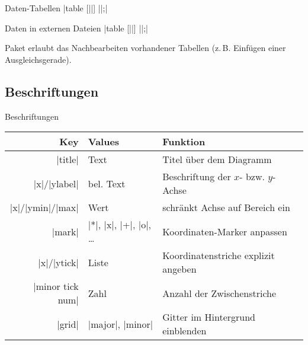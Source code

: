 \documentclass[
	vorläufig=false,
	datum=2017-12-01,
	titel={Diagramme},
	web=false,
	mo,
	aspectratio=1610,
]{../tex/latexkurs-slides}
\begin{document}
\begin{frame}[fragile,t]{Daten-Tabellen}
| table [||] {||};|
\vfill
\begin{LTXexample}[pos=r, explpreset={}, preset=\small, rframe={}]
\end{LTXexample}
\end{frame}


\begin{frame}[fragile,t]{Daten in externen Dateien}
| table [||] {||};|\vfill
\begin{LTXexample}[pos=r, explpreset={}, preset=\small, rframe={}]
\end{LTXexample}
\pause
Paket  erlaubt das Nachbearbeiten vorhandener Tabellen (z.\,B. Einfügen einer Ausgleichsgerade).
\end{frame}

\subsection{Beschriftungen}
\begin{frame}[fragile]{Beschriftungen}
\begin{tabular}{rll}
Key & Values & Funktion\\\midrule
|title| & Text & Titel über dem Diagramm\\
|x|/|ylabel| & bel. Text & Beschriftung der $x$- bzw. $y$-Achse  \\
|x|/|ymin|/|max| & Wert & schränkt Achse auf Bereich ein\\
|mark| & |*|, |x|, |+|, |o|, … & Koordinaten-Marker anpassen\\
|x|/|ytick| & Liste & Koordinatenstriche explizit angeben\\
|minor tick num| & Zahl & Anzahl der Zwischenstriche\\
|grid| & |major|, |minor| & Gitter im Hintergrund einblenden
\end{tabular}
\end{frame}
\end{document}

